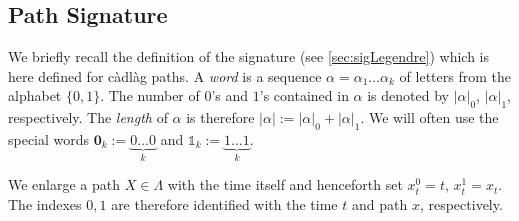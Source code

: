 

\subsection{Path Signature} 
We briefly recall the definition of the signature (see \cref{sec:sigLegendre})  which is here defined for  c\`adl\`ag  paths.%
A \textit{word} is a sequence  $\alpha = \alpha_1 \ldots \alpha_k$ of letters %
from the alphabet $\{0,1\}$.  The number of $0$'s and $1$'s contained in $\alpha$ is denoted by $|\alpha|_0$, $|\alpha|_1$, respectively. The \textit{length} of $\alpha$ is therefore $|\alpha| := |\alpha|_0 + |\alpha|_1$. We will often use the special words $\boldsymbol{0}_k := \underbrace{0\ldots 0}_{k}$ and $\mathds{1}_k := \underbrace{1\ldots 1}_{k}$.

We enlarge a path $X \in \Lambda$ with the time itself %
and henceforth set %
$x^0_{t} = t$, $x^1_{t} = x_t$.  The indexes $0,1$ are therefore identified with the time $t$ and path $x$, respectively.  
 
